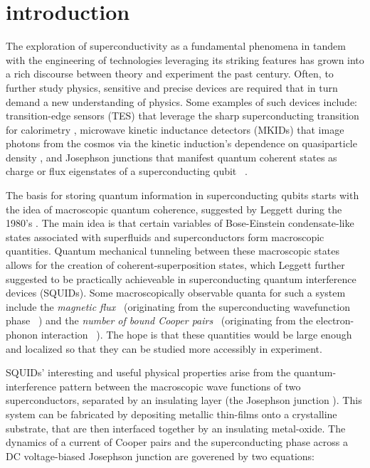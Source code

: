 \documentclass[%
 reprint,
showpacs,
 amsmath,amssymb,
 aps,
longbibliography,
]{revtex4-1}
\begin{document}
\section{introduction}
The exploration of superconductivity as a fundamental phenomena in tandem with the engineering of technologies leveraging its striking features has grown into a rich discourse between theory and experiment the past century. Often, to further study physics, sensitive and precise devices are required that in turn demand a new understanding of physics. Some examples of such devices include: transition-edge sensors (TES) that leverage the sharp superconducting transition for calorimetry \cite{Irwin_TES}, microwave kinetic inductance detectors (MKIDs) that image photons from the cosmos via the kinetic induction's dependence on quasiparticle density \cite{mkidjpl}, and Josephson junctions that manifest quantum coherent states as charge or flux eigenstates of a superconducting qubit \ \cite{Clarke}.

The basis for storing quantum information in superconducting qubits starts with the idea of macroscopic quantum coherence, suggested by Leggett during the 1980's \cite{Leggett}. The main idea is that certain variables of Bose-Einstein condensate-like states associated with superfluids and superconductors form macroscopic quantities. Quantum mechanical tunneling between these macroscopic states allows for the creation of coherent-superposition states, which Leggett further suggested to be practically achieveable in superconducting quantum interference devices (SQUIDs). Some macroscopically observable quanta for such a system include the \textit{magnetic flux} \ (originating from the superconducting wavefunction phase \ \cite{josephson}) and the \textit{number of bound Cooper pairs} \ (originating from the electron-phonon interaction \ \cite{bcs}). The hope is that these quantities would be large enough and localized so that they can be studied more accessibly in experiment.

SQUIDs' interesting and useful physical properties arise from the quantum-interference pattern between the macroscopic wave functions of two superconductors, separated by an insulating layer (the Josephson junction \cite{josephson}). This system can be fabricated by depositing metallic thin-films onto a crystalline substrate, that are then interfaced together by an insulating metal-oxide. The dynamics of a current of Cooper pairs and the superconducting phase across a DC voltage-biased Josephson junction are goverened by two equations:
\end{document}
